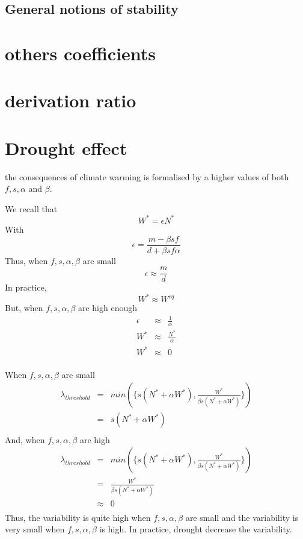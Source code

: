 \documentclass{article}
\begin{document}
\subsection{General notions of stability}


\newpage
\section{others coefficients}
\label{other_ratio}



\newpage
\section{derivation ratio}
\label{derivation_ratio}





\newpage
\section{Drought effect}
\label{drought_increase}



the consequences of climate warming is formalised by a higher values of both $f, s, \alpha$ and $\beta$.






We recall that 
\[
W^* = \epsilon N^*
\]
With
\[
\epsilon = \frac{m-\beta s f}{d + \beta s f \alpha}
\]
Thus, when $f, s, \alpha, \beta$ are small
\[
\epsilon \approx \frac{m}{d}
\]
In practice, 
\[
W^* \approx W^{eq}
\]
But, when $f, s, \alpha, \beta$ are high enough
\[
\begin{array}{rcl}
\epsilon & \approx & \frac{1}{\alpha} \\
W^* & \approx & \frac{N^*}{\alpha} \\
W^* & \approx & 0 \\
\end{array}
\]


When $f, s, \alpha, \beta$ are small
\[
\begin{array}{rcl}
\lambda_{threshold} & = & min(\{s(N^*+\alpha W^*), \frac{W^*}{\beta s (N^*+\alpha W^*)}\}) \\
& = & s(N^*+\alpha W^*) \\
\end{array}
\]
And, when $f, s, \alpha, \beta$ are high 
\[
\begin{array}{rcl}
\lambda_{threshold} & = & min(\{s(N^*+\alpha W^*), \frac{W^*}{\beta s (N^*+\alpha W^*)}\}) \\
& = & \frac{W^*}{\beta s (N^*+\alpha W^*)} \\
& \approx & 0 \\
\end{array}
\]
Thus, the variability is quite high when $f, s, \alpha, \beta$ are small and the variability is very small when $f, s, \alpha, \beta$ is high. In practice, drought decrease the variability.
\end{document}

